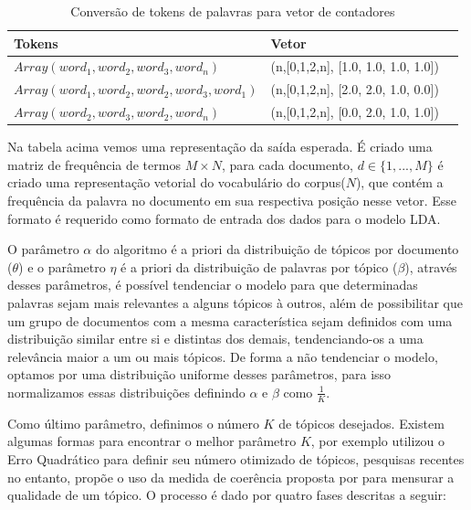 \documentclass[12pt,a4paper]{article}
\begin{document}
  
  \begin{table}[h]
    \centering
    \begin{tabular}{l l l}
    Tokens		&Vetor &\\
    \hline
    $Array(word_1, word_2, word_3, word_n)$						&(n,[0,1,2,n], [1.0, 1.0, 1.0, 1.0]) &\\
    $Array(word_1, word_2, word_2, word_3, word_1)$				&(n,[0,1,2,n], [2.0, 2.0, 1.0, 0.0]) &\\
    $Array(word_2, word_3, word_2, word_n)$						&(n,[0,1,2,n], [0.0, 2.0, 1.0, 1.0]) &\\
    \hline
    \end{tabular}
    \caption{Conversão de tokens de palavras para vetor de contadores}
  \end{table}
  
  
  Na tabela acima vemos uma representação da saída esperada. É criado uma matriz de frequência de termos $M \times N$, para cada documento,
   $d \in \{1,. . . , M\}$ é criado uma representação vetorial do vocabulário do corpus($N$), que contém a frequência da palavra no documento em sua respectiva posição nesse vetor.
   Esse formato é requerido como formato de entrada dos dados para o modelo LDA.
  
  O parâmetro $\alpha$ do algoritmo é a priori da distribuição de tópicos por documento ($\theta$) e o parâmetro $\eta$ é a priori da distribuição de palavras por tópico ($\beta$),
   através desses parâmetros, é possível tendenciar o modelo para que determinadas palavras sejam mais relevantes a alguns tópicos à outros,
   além de possibilitar que um grupo de documentos com a mesma característica sejam definidos com uma distribuição similar entre si e distintas dos demais,
   tendenciando-os a uma relevância maior a um ou mais tópicos. De forma a não tendenciar o modelo, optamos por uma distribuição uniforme desses parâmetros,
   para isso normalizamos essas distribuições definindo $\alpha$ e $\beta$ como $\frac{1}{K}$.
  
  Como último parâmetro, definimos o número $K$ de tópicos desejados. Existem algumas formas para encontrar o melhor parâmetro $K$,
    por exemplo utilizou o Erro Quadrático para definir seu número otimizado de tópicos, pesquisas recentes no entanto,
   propõe o uso da medida de coerência proposta por  para mensurar a qualidade de um tópico. O processo é dado por quatro fases descritas a seguir:
  
\end{document}
